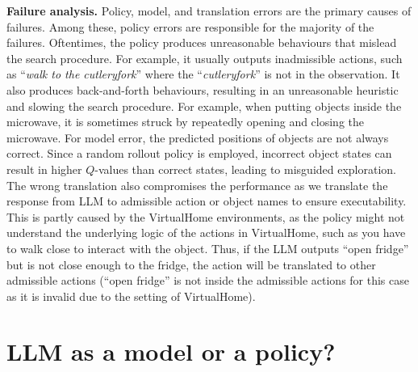 \textbf{Failure analysis.}
Policy, model, and translation errors are the primary causes of failures. Among these, policy errors are responsible for the majority of the failures. Oftentimes, the policy produces unreasonable behaviours that mislead the search procedure. For example, it usually outputs inadmissible actions, such as ``\textit{walk to the cutleryfork}'' where the ``\textit{cutleryfork}'' is not in the observation. It also produces back-and-forth behaviours, resulting in an unreasonable heuristic and slowing the search procedure. For example, when putting objects inside the microwave, it is sometimes struck by repeatedly opening and closing the microwave. For model error, the predicted positions of objects are not always correct. Since a random rollout policy is employed, incorrect object states can result in higher $Q$-values than correct states, leading to misguided exploration. The wrong translation also compromises the performance as we translate the response from LLM to admissible action or object names to ensure executability. This is partly caused by the VirtualHome environments, as the policy might not understand the underlying logic of the actions in VirtualHome, such as you have to walk close to interact with the object. Thus, if the LLM outputs ``open fridge'' but is not close enough to the fridge, the action will be translated to other admissible actions (``open fridge'' is not inside the admissible actions for this case as it is invalid due to the setting of VirtualHome). 

\section{LLM as a model or a policy?}\label{sec:mdl}

